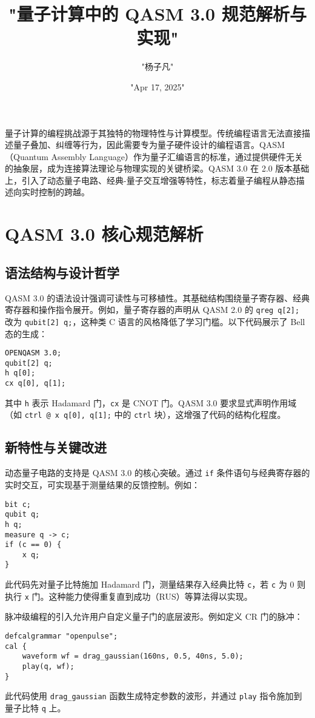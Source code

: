 \title{"量子计算中的 QASM 3.0 规范解析与实现"}
\author{"杨子凡"}
\date{"Apr 17, 2025"}
\maketitle
量子计算的编程挑战源于其独特的物理特性与计算模型。传统编程语言无法直接描述量子叠加、纠缠等行为，因此需要专为量子硬件设计的编程语言。QASM（Quantum Assembly Language）作为量子汇编语言的标准，通过提供硬件无关的抽象层，成为连接算法理论与物理实现的关键桥梁。QASM 3.0 在 2.0 版本基础上，引入了动态量子电路、经典-量子交互增强等特性，标志着量子编程从静态描述向实时控制的跨越。\par
\chapter{QASM 3.0 核心规范解析}
\section{语法结构与设计哲学}
QASM 3.0 的语法设计强调可读性与可移植性。其基础结构围绕量子寄存器、经典寄存器和操作指令展开。例如，量子寄存器的声明从 QASM 2.0 的 \verb!qreg q[2];! 改为 \verb!qubit[2] q;!，这种类 C 语言的风格降低了学习门槛。以下代码展示了 Bell 态的生成：\par
\begin{lstlisting}[language=qasm]
OPENQASM 3.0;
qubit[2] q;
h q[0];
cx q[0], q[1];
\end{lstlisting}
其中 \verb!h! 表示 Hadamard 门，\verb!cx! 是 CNOT 门。QASM 3.0 要求显式声明作用域（如 \verb!ctrl @ x q[0], q[1];! 中的 \verb!ctrl! 块），这增强了代码的结构化程度。\par
\section{新特性与关键改进}
动态量子电路的支持是 QASM 3.0 的核心突破。通过 \verb!if! 条件语句与经典寄存器的实时交互，可实现基于测量结果的反馈控制。例如：\par
\begin{lstlisting}[language=qasm]
bit c;
qubit q;
h q;
measure q -> c;
if (c == 0) {
    x q;
}
\end{lstlisting}
此代码先对量子比特施加 Hadamard 门，测量结果存入经典比特 \verb!c!，若 \verb!c! 为 0 则执行 \verb!x! 门。这种能力使得重复直到成功（RUS）等算法得以实现。\par
脉冲级编程的引入允许用户自定义量子门的底层波形。例如定义 CR 门的脉冲：\par
\begin{lstlisting}[language=qasm]
defcalgrammar "openpulse";
cal {
    waveform wf = drag_gaussian(160ns, 0.5, 40ns, 5.0);
    play(q, wf);
}
\end{lstlisting}
此代码使用 \verb!drag_gaussian! 函数生成特定参数的波形，并通过 \verb!play! 指令施加到量子比特 \verb!q! 上。\par
